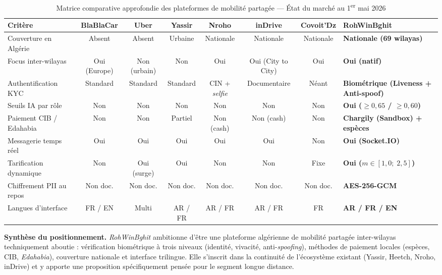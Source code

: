 \begin{landscape}
\begin{table}[!htbp]
\centering
\footnotesize
\renewcommand{\arraystretch}{1.3}
\begin{tabularx}{\linewidth}{|l|c|c|c|c|c|c|X|}
\hline
\rowcolor{rohlight}
\textbf{Critère} & \textbf{BlaBlaCar} & \textbf{Uber} & \textbf{Yassir} & \textbf{Nroho} & \textbf{inDrive} & \textbf{Covoit'Dz} & \textbf{RohWinBghit} \\
\hline
Couverture en Algérie & Absent & Absent & Urbaine & Nationale & Nationale & Nationale & \textbf{Nationale (69 wilayas)} \\
\hline
Focus inter-wilayas & Oui (Europe) & Non (urbain) & Non & Oui & Oui (City to City) & Oui & \textbf{Oui (natif)} \\
\hline
Authentification KYC & Standard & Standard & Standard & CIN + \textit{selfie} & Documentaire & Néant & \textbf{Biométrique (Liveness + Anti-spoof)} \\
\hline
Seuils IA par rôle & Non & Non & Non & Non & Non & Non & \textbf{Oui ($\geq 0{,}65$ / $\geq 0{,}60$)} \\
\hline
Paiement CIB / Edahabia & Non & Non & Partiel & Non (cash) & Non (cash) & Non & \textbf{Chargily (Sandbox) + espèces} \\
\hline
Messagerie temps réel & Oui & Oui & Oui & Oui & Oui & Non & \textbf{Oui (Socket.IO)} \\
\hline
Tarification dynamique & Non & Oui (surge) & Oui & Non & Non & Fixe & \textbf{Oui ($m \in [1{,}0;\; 2{,}5]$)} \\
\hline
Chiffrement PII au repos & Non doc. & Non doc. & Non doc. & Non doc. & Non doc. & Non doc. & \textbf{AES-256-GCM} \\
\hline
Langues d'interface & FR / EN & Multi & AR / FR & AR / FR & AR / FR & FR & \textbf{AR / FR / EN} \\
\hline
\end{tabularx}
  \caption{Matrice comparative approfondie des plateformes de mobilité partagée --- État du marché au 1\textsuperscript{er} mai 2026}
  \label{tab:comparatif}
\end{table}

\begin{highlight}
\textbf{Synthèse du positionnement.} \textit{RohWinBghit} ambitionne d'être une plateforme algérienne de mobilité partagée inter-wilayas techniquement aboutie : vérification biométrique à trois niveaux (identité, vivacité, anti-\textit{spoofing}), méthodes de paiement locales (espèces, CIB, \textit{Edahabia}), couverture nationale et interface trilingue. Elle s'inscrit dans la continuité de l'écosystème existant (Yassir, Heetch, Nroho, inDrive) et y apporte une proposition spécifiquement pensée pour le segment longue distance.
\end{highlight}


\end{landscape}
